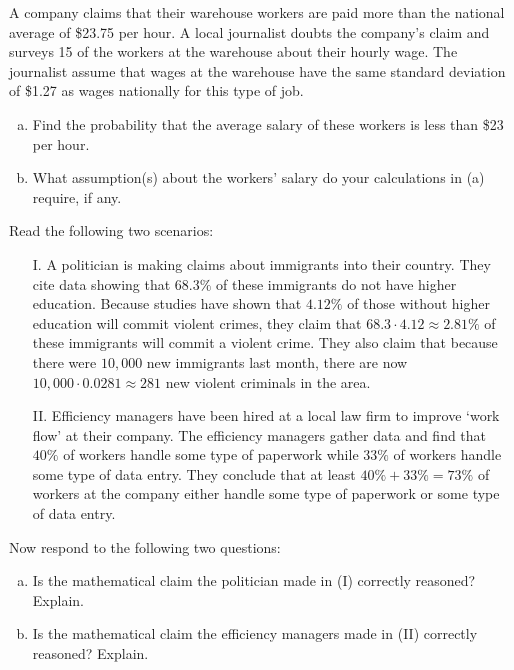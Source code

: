 \documentclass[12pt,letterpaper]{exam}
\begin{document}
\begin{questions}
\newpage
\question[10] A company claims that their warehouse workers are paid more than the national average of \$23.75 per hour. A local journalist doubts the company's claim and surveys 15 of the workers at the warehouse about their hourly wage. The journalist assume that wages at the warehouse have the same standard deviation of \$1.27 as wages nationally for this type of job.
	\begin{enumerate}[(a)]
	\item Find the probability that the average salary of these workers is less than \$23 per hour.
	\item What assumption(s) about the workers' salary do your calculations in (a) require, if any. 
	\end{enumerate}



\newpage
\question[10] Read the following two scenarios:
	\begin{enumerate}
	\item[I.] A politician is making claims about immigrants into their country. They cite data showing that $68.3\%$ of these immigrants do not have higher education. Because studies have shown that $4.12\%$ of those without higher education will commit violent crimes, they claim that $68.3 \cdot 4.12 \approx 2.81\%$ of these immigrants will commit a violent crime. They also claim that because there were $10,000$ new immigrants last month, there are now $10,\!000 \cdot 0.0281 \approx 281$ new violent criminals in the area.
	\item[II.] Efficiency managers have been hired at a local law firm to improve `work flow' at their company. The efficiency managers gather data and find that $40\%$ of workers handle some type of paperwork while $33\%$ of workers handle some type of data entry. They conclude that at least $40\% + 33\%= 73\%$ of workers at the company either handle some type of paperwork or some type of data entry. 
	\end{enumerate}
Now respond to the following two questions:

\begin{enumerate}[(a)]
\item Is the mathematical claim the politician made in (I) correctly reasoned? Explain.
\item Is the mathematical claim the efficiency managers made in (II) correctly reasoned? Explain.
\end{enumerate}












\end{questions}
\end{document}
